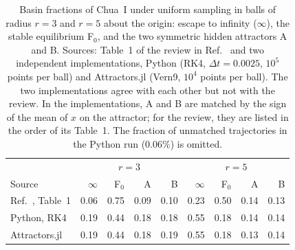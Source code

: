 
\begin{table}[tbhp]
\centering
\caption{Basin fractions of Chua~I under uniform sampling in balls of radius $r=3$ and $r=5$ about the origin: escape to infinity ($\infty$), the stable equilibrium F$_0$, and the two symmetric hidden attractors A and B. Sources: Table~1 of the review in Ref.~\cite{GuanXie2025} and two independent implementations, Python (RK4, $\Delta t=0.0025$, $10^5$ points per ball) and Attractors.jl (Vern9, $10^4$ points per ball). The two implementations agree with each other but not with the review. In the implementations, A and B are matched by the sign of the mean of $x$ on the attractor; for the review, they are listed in the order of its Table~1. The fraction of unmatched trajectories in the Python run (0.06\%) is omitted.}
\label{tab:chuafrac}
\scriptsize
\setlength{\tabcolsep}{3pt}

\begin{tabular}{lrrrrrrrr}
\toprule
 & \multicolumn{4}{c}{$r=3$} & \multicolumn{4}{c}{$r=5$} \\
Source & $\infty$ & F$_0$ & A & B & $\infty$ & F$_0$ & A & B \\
\midrule
Ref.~\cite{GuanXie2025}, Table~1 & 0.06 & 0.75 & 0.09 & 0.10 & 0.23 & 0.50 & 0.14 & 0.13 \\
Python, RK4 & 0.19 & 0.44 & 0.18 & 0.18 & 0.55 & 0.18 & 0.14 & 0.14 \\
Attractors.jl & 0.19 & 0.44 & 0.18 & 0.19 & 0.55 & 0.18 & 0.13 & 0.14 \\
\bottomrule
\end{tabular}

\end{table}

